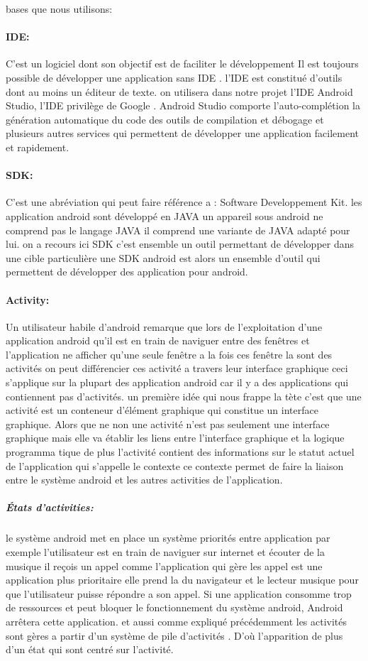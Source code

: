 bases que nous utilisons:
\paragraph{IDE:}
C'est un logiciel dont son objectif est de faciliter le développement 
Il est toujours possible de développer une application sans IDE . 
l'IDE est constitué d'outils dont au moins un éditeur de texte. 
on utilisera dans notre projet l'IDE Android Studio, l'IDE privilège 
de Google . Android Studio comporte l'auto-complétion la génération
automatique  du code des outils de compilation et débogage et plusieurs
autres services qui permettent de développer une application facilement et
rapidement.
\paragraph{SDK:}
C’est une abréviation qui peut faire référence a :
Software Developpement Kit. les application android sont 
développé en JAVA un appareil sous android  ne comprend pas
le langage JAVA il comprend une variante de JAVA adapté pour lui.
on a recours ici SDK c'est ensemble un outil permettant de développer 
dans une  cible particulière une SDK android est alors un ensemble d'outil
qui permettent de développer des application pour android.
\paragraph{Activity:}
Un utilisateur habile d'android remarque que lors de l'exploitation d'une
application android qu'il est en train de naviguer entre des fenêtres et 
l'application ne afficher qu'une seule fenêtre a la fois  ces fenêtre la sont 
des activités on peut différencier ces activité a travers leur interface 
graphique ceci s'applique sur la plupart des application android car il y a
des applications qui contiennent pas d'activités. un première idée qui nous
frappe la tète c'est que une activité est un conteneur d'élément graphique qui 
constitue un interface graphique. Alors que ne non une activité n'est pas 
seulement une interface graphique mais elle va établir les liens entre l'interface 
graphique et la logique programma tique de plus l'activité contient des 
informations sur le statut actuel de l'application qui s'appelle le contexte
ce contexte permet de faire la liaison entre le système android et les autres 
activities de l'application.
\subparagraph{États d'activities:}
le système android met en place un système priorités entre application 
par exemple l'utilisateur est en train de naviguer sur internet et écouter 
de la musique il reçois un appel comme l'application qui gère les appel est 
une application plus prioritaire elle prend la du navigateur et le lecteur 
musique pour que l'utilisateur puisse répondre a son appel. Si une application
consomme trop de ressources et peut bloquer le fonctionnement du système android,
Android arrêtera cette application. et aussi comme expliqué précédemment 
les activités sont gères a partir d'un système de pile d'activités .
D'où l'apparition de plus d'un état qui sont centré sur l'activité.

